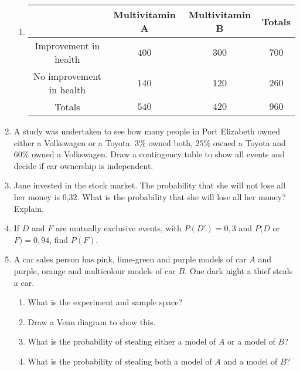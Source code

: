 \begin{eocexercises}{}
\begin{enumerate}
\begin{enumerate}
	\item \begin{center}
\begin{tabular}{|c|c|c|c|}
\hline
                         & Multivitamin A & Multivitamin B & Totals \\
\hline
Improvement in health    & $400$            & $300$            & $700$    \\
No improvement in health & $140 $           &$ 120 $           & $260 $   \\
\hline
Totals                   & $540 $           & $420$            & $960$    \\
\hline
\end{tabular}

\end{center}
	\end{enumerate}
\item A study was undertaken to see how many people in Port Elizabeth owned either a Volkswagen or a Toyota. $3\%$ owned both, $25\%$ owned a Toyota and $60\%$ owned a Volkswagen. Draw a contingency table to show all events and decide if car ownership is independent.
\item Jane invested in the stock market. The probability that she will not lose all her money is 0,32. What is the probability that she will lose all her money? Explain.
\item If $D$ and $ F$ are mutually exclusive events, with $P(D')=0,3$ and $P(D$ or $F)=0,94$, find $P(F)$.
\item A car sales person has pink, lime-green and purple models of car $A$ and purple, orange and multicolour models of car $B$. One dark night a thief steals a car. 
	\begin{enumerate}
	\item What is the experiment and sample space? 
	\item Draw a Venn diagram to show this.
	\item What is the probability of stealing either a model of $A$ or a model of $B$?
	\item What is the probability of stealing both a model of $A$ and a model of $B$?
	\end{enumerate}

\end{enumerate}
\end{eocexercises}
